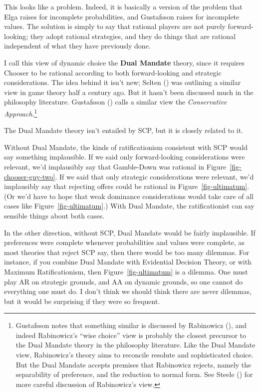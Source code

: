 \documentclass[
  11pt,
  letterpaper,
  DIV=11,
  numbers=noendperiod,
  twoside]{scrartcl}
\begin{document}
This looks like a problem. Indeed, it is basically a version of the
problem that Elga raises for incomplete probabilities, and Gustafsson
raises for incomplete values. The solution is simply to say that
rational players are not purely forward-looking; they adopt rational
strategies, and they do things that are rational independent of what
they have previously done.

I call this view of dynamic choice the \textbf{Dual Mandate} theory,
since it requires Chooser to be rational according to both
forward-looking and strategic considerations. The idea behind it isn't
new; Selten () was outlining a similar
view in game theory half a century ago. But it hasn't been discussed
much in the philosophy literature. Gustafsson
() calls a similar view the
\emph{Conservative Approach}.\footnote{Gustafsson notes that something
  similar is discussed by Rabinowicz
  (), and indeed Rabinowicz's ``wise
  choice'' view is probably the closest precursor to the Dual Mandate
  theory in the philosophy literature. Like the Dual Mandate view,
  Rabinowicz's theory aims to reconcile resolute and sophisticated
  choice. But the Dual Mandate accepts premises that Rabinowicz rejects,
  namely the separability of preference, and the reduction to normal
  form. See Steele () for more careful
  discussion of Rabinowicz's view.}

The Dual Mandate theory isn't entailed by SCP, but it is closely related
to it.

Without Dual Mandate, the kinds of ratificationism consistent with SCP
would say something implausible. If we said only forward-looking
considerations were relevant, we'd implausibly say that Gamble-Down was
rational in Figure~\ref{fig-chooser-guy-two}. If we said that only
strategic considerations were relevant, we'd implausibly say that
rejecting offers could be rational in Figure~\ref{fig-ultimatum}. (Or
we'd have to hope that weak dominance considerations would take care of
all cases like Figure~\ref{fig-ultimatum}.) With Dual Mandate, the
ratificationist can say sensible things about both cases.

In the other direction, without SCP, Dual Mandate would be fairly
implausible. If preferences were complete whenever probabilities and
values were complete, as most theories that reject SCP say, then there
would be too many dilemmas. For instance, if you combine Dual Mandate
with Evidential Decision Theory, or with Maximum Ratificationism, then
Figure~\ref{fig-ultimatum} is a dilemma. One must play AR on strategic
grounds, and AA on dynamic grounds, so one cannot do everything one must
do. I don't think we should think there are never dilemmas, but it would
be surprising if they were so frequent.
\end{document}
